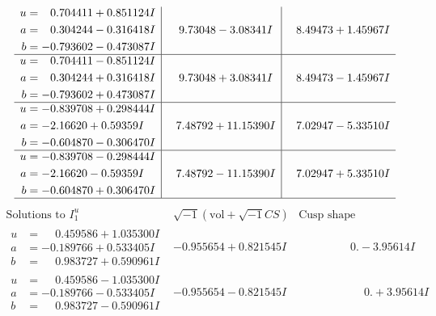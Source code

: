 \documentclass[1p]{elsarticle_modified}
\theoremstyle{definition}
\newcommand{\I}{\sqrt{-1}}
\begin{document}
$$\begin{array}{c|c|c}
\begin{aligned}
u &= \phantom{-}0.704411 + 0.851124 I \\
a &= \phantom{-}0.304244 - 0.316418 I \\
b &= -0.793602 - 0.473087 I\end{aligned}
 & \phantom{-}9.73048 - 3.08341 I & \phantom{-}8.49473 + 1.45967 I \\ \hline\begin{aligned}
u &= \phantom{-}0.704411 - 0.851124 I \\
a &= \phantom{-}0.304244 + 0.316418 I \\
b &= -0.793602 + 0.473087 I\end{aligned}
 & \phantom{-}9.73048 + 3.08341 I & \phantom{-}8.49473 - 1.45967 I \\ \hline\begin{aligned}
u &= -0.839708 + 0.298444 I \\
a &= -2.16620 + 0.59359 I \\
b &= -0.604870 - 0.306470 I\end{aligned}
 & \phantom{-}7.48792 + 11.15390 I & \phantom{-}7.02947 - 5.33510 I \\ \hline\begin{aligned}
u &= -0.839708 - 0.298444 I \\
a &= -2.16620 - 0.59359 I \\
b &= -0.604870 + 0.306470 I\end{aligned}
 & \phantom{-}7.48792 - 11.15390 I & \phantom{-}7.02947 + 5.33510 I\\
 \hline 
 \end{array}$$\newpage$$\begin{array}{c|c|c}  
\text{Solutions to }I^u_{1}& \I (\text{vol} + \sqrt{-1}CS) & \text{Cusp shape}\\
 \hline 
\begin{aligned}
u &= \phantom{-}0.459586 + 1.035300 I \\
a &= -0.189766 + 0.533405 I \\
b &= \phantom{-}0.983727 + 0.590961 I\end{aligned}
 & -0.955654 + 0.821545 I & \phantom{-0.000000 } 0. - 3.95614 I \\ \hline\begin{aligned}
u &= \phantom{-}0.459586 - 1.035300 I \\
a &= -0.189766 - 0.533405 I \\
b &= \phantom{-}0.983727 - 0.590961 I\end{aligned}
 & -0.955654 - 0.821545 I & \phantom{-0.000000 -}0. + 3.95614 I \\ \hline\begin{aligned}

\end{aligned}
\end{array}$$
\end{document}
